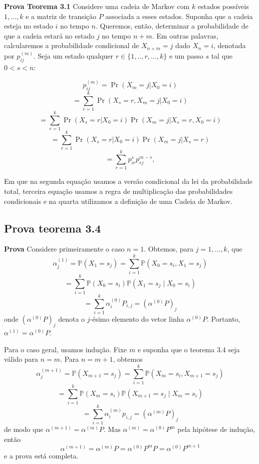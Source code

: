 \documentclass[12pt]{article}
\theoremstyle{break}
\begin{document}



\textbf{Prova Teorema 3.1}
Considere uma cadeia de Markov com \( k \) estados possíveis \(1, \dots, k\) e a matriz de transição \( P \) associada a esses estados. Suponha que a cadeia esteja no estado \( i \) no tempo \( n \). Queremos, então, determinar a probabilidade de que a cadeia estará no estado \( j \) no tempo \( n+m\). Em outras palavras, calcularemos a probabilidade condicional de \( X_{n+m} = j \) dado \( X_n = i \), denotada por \( p_{ij}^{(m)} \). Seja um estado qualquer $r \in \{1,..,r,...,k\}$ e um passo $s$ tal que $0 < s < n$: 



\[
p_{ij}^{(m)} = \Pr(X_{m} = j | X_0 = i)
\]
\[
= \sum_{r=1}^{k} \Pr(X_{s} = r , X_{m} = j | X_0 = i)
\]
\[
= \sum_{r=1}^{k} \Pr(X_{s} = r | X_0 = i) \Pr(X_{m} = j | X_{s} = r, X_0 = i)
\]
\[
= \sum_{r=1}^{k} \Pr(X_{s} = r | X_0 = i) \Pr(X_{m} = j | X_{s} = r)
\]
\[
= \sum_{r=1}^{k} p_{ir}^{s} p_{rj}^{m-s},
\]


Em que na segunda equação usamos a versão condicional da lei da probabilidade total,  terceira equação usamos a regra de multiplicação das probabilidades condicionais  e na quarta utilizamos a definição de uma Cadeia de Markov.

\subsection{Prova teorema 3.4}



\textbf{Prova} Considere primeiramente o caso \( n = 1 \). Obtemos, para \( j = 1, \ldots, k \), que
\[
\alpha_j^{(1)} = \mathbb{P}(X_1 = s_j) = \sum_{i=1}^k \mathbb{P}(X_0 = s_i, X_1 = s_j)
\]
\[
= \sum_{i=1}^k \mathbb{P}(X_0 = s_i) \mathbb{P}(X_1 = s_j \mid X_0 = s_i)
\]
\[
= \sum_{i=1}^k \alpha_i^{(0)} P_{i,j} = (\alpha^{(0)} P)_j
\]
onde \( (\alpha^{(0)} P)_j \) denota o \( j \)-ésimo elemento do vetor linha \( \alpha^{(0)} P \). Portanto, \( \alpha^{(1)} = \alpha^{(0)} P \).

Para o caso geral, usamos indução. Fixe \( m \) e suponha que o teorema 3.4 seja válido para \( n = m \). Para \( n = m + 1 \), obtemos
\[
\alpha_j^{(m+1)} = \mathbb{P}(X_{m+1} = s_j) = \sum_{i=1}^k \mathbb{P}(X_m = s_i, X_{m+1} = s_j)
\]
\[
= \sum_{i=1}^k \mathbb{P}(X_m = s_i) \mathbb{P}(X_{m+1} = s_j \mid X_m = s_i)
\]
\[
= \sum_{i=1}^k \alpha_i^{(m)} p_{i,j} = (\alpha^{(m)} P)_j
\]
de modo que \( \alpha^{(m+1)} = \alpha^{(m)} P \). Mas \( \alpha^{(m)} = \alpha^{(0)} P^m \) pela hipótese de indução, então
\[
\alpha^{(m+1)} = \alpha^{(m)} P = \alpha^{(0)} P^m P = \alpha^{(0)} P^{m+1}
\]
e a prova está completa.
\end{document}
